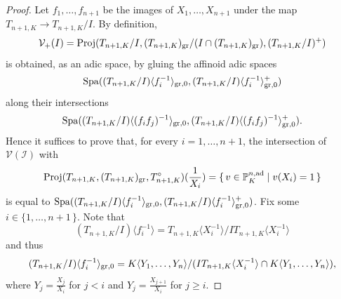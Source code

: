 \documentclass[12pt,twoside,a4paper]{article}
\theoremstyle{definition}
\theoremstyle{remark}
\newcommand\ad{{\rm ad}}
\newcommand\gr{{\rm gr}}
\newcommand\Proj{{\rm Proj}}
\newcommand\Spa{{\rm Spa}}
\begin{document}
\begin{proof}Let $f_1,\dots, f_{n+1}$ be the images of $X_1,\dots, X_{n+1}$ under the map $T_{n+1, K}\to T_{n+1, K}/I$. By definition, \begin{equation*}\mathcal{V}_{+}(I)=\Proj(T_{n+1, K}/I, (T_{n+1, K})_{\gr}/(I\cap (T_{n+1, K})_{\gr}), (T_{n+1, K}/I)^{+})\end{equation*}is obtained, as an adic space, by gluing the affinoid adic spaces \begin{equation*}\Spa((T_{n+1, K}/I)\langle f_{i}^{-1}\rangle_{\gr, 0}, (T_{n+1, K}/I)\langle f_{i}^{-1}\rangle_{\gr, 0}^{+})\end{equation*}along their intersections \begin{equation*}\Spa((T_{n+1, K}/I)\langle (f_{i}f_{j})^{-1}\rangle_{\gr, 0}, (T_{n+1, K}/I)\langle (f_{i}f_{j})^{-1}\rangle_{\gr, 0}^{+}).\end{equation*}Hence it suffices to prove that, for every $i=1,\dots, n+1$, the intersection of $\mathcal{V}(\mathcal{I})$ with \begin{equation*}\Proj(T_{n+1, K}, (T_{n+1, K})_{\gr}, T_{n+1, K}^{\circ})(\frac{1}{X_{i}})=\{\, v\in \mathbb{P}_{K}^{n,\ad}\mid v(X_{i})=1\,\}\end{equation*}is equal to $\Spa((T_{n+1, K}/I)\langle f_{i}^{-1}\rangle_{\gr, 0}, (T_{n+1, K}/I)\langle f_{i}^{-1}\rangle_{\gr, 0}^{+})$. Fix some $i\in\{1, \dots, n+1\,\}$. Note that \begin{equation*}(T_{n+1, K}/I)\langle f_{i}^{-1}\rangle=T_{n+1, K}\langle X_{i}^{-1}\rangle/IT_{n+1, K}\langle X_{i}^{-1}\rangle\end{equation*}and thus \begin{equation*}(T_{n+1, K}/I)\langle f_{i}^{-1}\rangle_{\gr, 0}=K\langle Y_1,\dots, Y_n\rangle/(IT_{n+1, K}\langle X_{i}^{-1}\rangle\cap K\langle Y_1,\dots, Y_n\rangle),\end{equation*}where $Y_{j}=\frac{X_{j}}{X_{i}}$ for $j<i$ and $Y_{j}=\frac{X_{j+1}}{X_{i}}$ for $j\geq i$. 


\end{proof}
\end{document}
